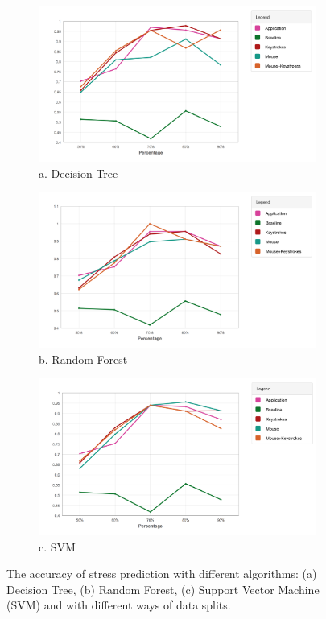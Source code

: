 \documentclass{article}
\begin{document}
\begin{figure}
	\centering
	\begin{subfigure}
		\centering
		\includegraphics[width=\columnwidth]{DecisionTree_2.png} {a. Decision Tree}
	\end{subfigure}
	\begin{subfigure}
		\centering
		\includegraphics[width=\columnwidth]{RandomForest_2.png} {b. Random Forest}
	\end{subfigure}
	\begin{subfigure}
		\centering
		\includegraphics[width=\columnwidth]{SVM_2.png} {c. SVM}
	\end{subfigure}
	\caption{The accuracy of stress prediction with different algorithms: (a) Decision Tree, (b) Random Forest, (c) Support Vector Machine (SVM) and with different ways of data splits.} \label{prediction}
\end{figure}
\end{document}
